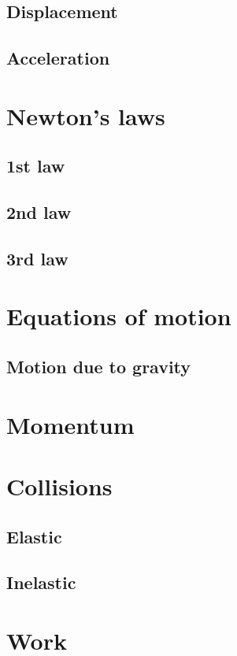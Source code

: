 \documentclass{book}
\begin{document}
\subsection{Displacement}

\subsection{Acceleration}


\section{Newton's laws}
\subsection{1st law}

\subsection{2nd law}

\subsection{3rd law}


\section{Equations of motion}
\subsection{Motion due to gravity}


\section{Momentum}


\section{Collisions}
\subsection{Elastic}

\subsection{Inelastic}


\section{Work}
\end{document}
